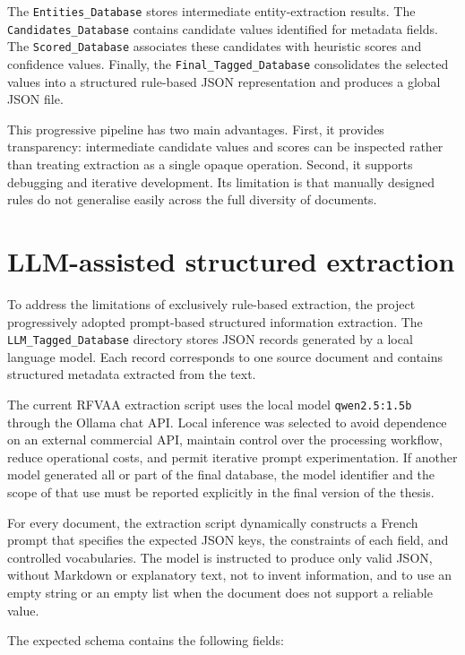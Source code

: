 The \texttt{Entities\_Database} stores intermediate entity-extraction results.
The \texttt{Candidates\_Database} contains candidate values identified for
metadata fields. The \texttt{Scored\_Database} associates these candidates with
heuristic scores and confidence values. Finally, the
\texttt{Final\_Tagged\_Database} consolidates the selected values into a
structured rule-based JSON representation and produces a global JSON file.

This progressive pipeline has two main advantages. First, it provides
transparency: intermediate candidate values and scores can be inspected rather
than treating extraction as a single opaque operation. Second, it supports
debugging and iterative development. Its limitation is that manually designed
rules do not generalise easily across the full diversity of documents.

\section{LLM-assisted structured extraction}

To address the limitations of exclusively rule-based extraction, the project
progressively adopted prompt-based structured information extraction. The
\texttt{LLM\_Tagged\_Database} directory stores JSON records generated by a
local language model. Each record corresponds to one source document and
contains structured metadata extracted from the text.

The current RFVAA extraction script uses the local model
\texttt{qwen2.5:1.5b} through the Ollama chat API. Local inference was selected
to avoid dependence on an external commercial API, maintain control over the
processing workflow, reduce operational costs, and permit iterative prompt
experimentation. If another model generated all or part of the final database,
the model identifier and the scope of that use must be reported explicitly in
the final version of the thesis.

For every document, the extraction script dynamically constructs a French prompt
that specifies the expected JSON keys, the constraints of each field, and
controlled vocabularies. The model is instructed to produce only valid JSON,
without Markdown or explanatory text, not to invent information, and to use an
empty string or an empty list when the document does not support a reliable
value.

The expected schema contains the following fields:

